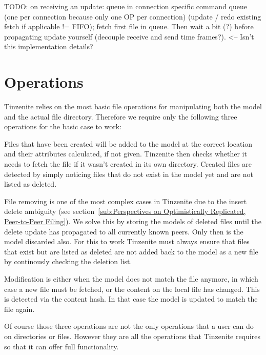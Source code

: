 TODO: on receiving an update: queue in connection specific command queue (one per connection because only one OP per connection) (update / redo existing fetch if applicable != FIFO); fetch first file in queue.
Then wait a bit (?) before propagating update yourself (decouple receive and send time frames?). <-- Isn't this implementation details?

\section{Operations}
\label{sec:Operations}

Tinzenite relies on the most basic file operations for manipulating both the model and the actual file directory.
Therefore we require only the following three operations for the basic case to work:

\begin{description}[leftmargin=5em,style=nextline,noitemsep,nolistsep]
    \item[Create]
        Files that have been created will be added to the model at the correct location and their attributes calculated, if not given.
        Tinzenite then checks whether it needs to fetch the file if it wasn't created in its own directory.
        Created files are detected by simply noticing files that do not exist in the model yet and are not listed as deleted.
    \item[Remove]
        File removing is one of the most complex cases in Tinzenite due to the insert delete ambiguity (see section~\ref{sub:Perspectives on Optimistically Replicated, Peer-to-Peer Filing}).
        We solve this by storing the models of deleted files until the delete update has propagated to all currently known peers.
        Only then is the model discarded also.
        For this to work Tinzenite must always ensure that files that exist but are listed as deleted are not added back to the model as a new file by continously checking the deletion list.
    \item[Modify]
        Modification is either when the model does not match the file anymore, in which case a new file must be fetched, or the content on the local file has changed.
        This is detected via the content hash.
        In that case the model is updated to match the file again.
\end{description}

Of course those three operations are not the only operations that a user can do on directories or files.
However they are all the operations that Tinzenite requires so that it can offer full functionality.

